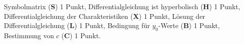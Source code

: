 \begin{bewertung}
Symbolmatrix ({\bf S}) 1 Punkt,
Differentialgleichung ist hyperbolisch ({\bf H}) 1 Punkt,
Differentialgleichung der Charakteristiken ({\bf X}) 1 Punkt,
Lösung der Differentialgleichung ({\bf L}) 1 Punkt,
Bedingung für $y_0$-Werte ({\bf B}) 1 Punkt,
Bestimmung von $c$ ({\bf C}) 1 Punkt.
\end{bewertung}
